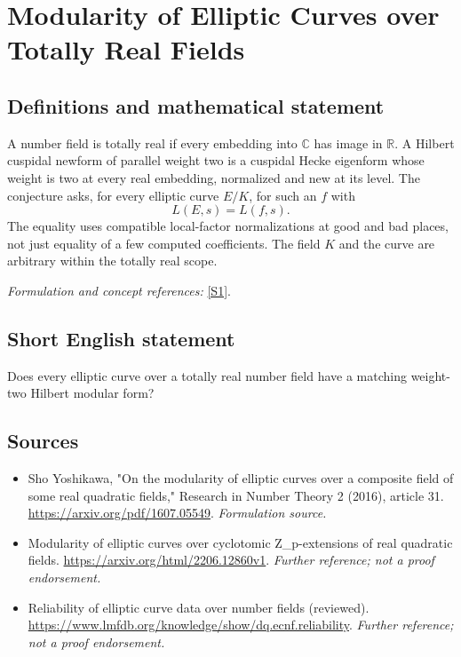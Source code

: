 \documentclass[11pt]{article}
\begin{document}
\section*{\texorpdfstring{Modularity of Elliptic Curves over Totally Real Fields}{Modularity of Elliptic Curves over Totally Real Fields}}\label{67}
\subsection{Definitions and mathematical statement}
A number field is totally real if every embedding into ${\mathbb{C}}$ has image in ${\mathbb{R}}$. A Hilbert cuspidal newform of parallel weight two is a cuspidal Hecke eigenform whose weight is two at every real embedding, normalized and new at its level. The conjecture asks, for every elliptic curve $E/K$, for such an $f$ with
\[
 L(E,s)=L(f,s).
\]
The equality uses compatible local-factor normalizations at good and bad places, not just equality of a few computed coefficients. The field $K$ and the curve are arbitrary within the totally real scope.
\par\smallskip\textit{Formulation and concept references:} \href{https://arxiv.org/pdf/1607.05549}{[S1]}.

\subsection{Short English statement}
Does every elliptic curve over a totally real number field have a matching weight-two Hilbert modular form?
\subsection{Sources}
\begin{itemize}
\item[S1]Sho Yoshikawa, "On the modularity of elliptic curves over a composite field of some real quadratic fields," Research in Number Theory 2 (2016), article 31.
\url{https://arxiv.org/pdf/1607.05549}.
\textit{Formulation source.}
\item[S2]Modularity of elliptic curves over cyclotomic Z\_p-extensions of real quadratic fields.
\url{https://arxiv.org/html/2206.12860v1}.
\textit{Further reference; not a proof endorsement.}
\item[S3]Reliability of elliptic curve data over number fields (reviewed).
\url{https://www.lmfdb.org/knowledge/show/dq.ecnf.reliability}.
\textit{Further reference; not a proof endorsement.}
\end{itemize}
\end{document}
